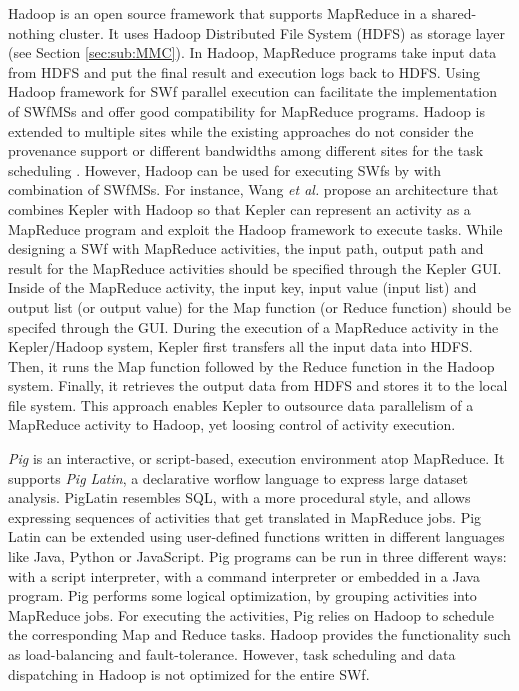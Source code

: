 Hadoop is an open source framework that supports MapReduce in a shared-nothing cluster.
It uses Hadoop Distributed File System (HDFS) as storage layer
(see Section \ref{sec:sub:MMC}). In Hadoop, MapReduce programs take
input data from HDFS and put the final result and execution logs back
to HDFS. Using Hadoop framework for SWf parallel execution can
facilitate the implementation of SWfMSs and offer good compatibility
for MapReduce programs.
Hadoop is extended to multiple sites while the existing approaches do not consider the provenance support or different bandwidths among different sites for the task scheduling \cite{Wang2013}. However, Hadoop can be used for executing SWfs by with combination of SWfMSs.
For instance, Wang \textit{et al.}
\cite{Wang2009} propose an architecture that combines
Kepler with Hadoop so that Kepler can represent an activity as a
MapReduce program and exploit the Hadoop framework to execute tasks. While
designing a SWf with MapReduce activities, the input
path, output path and result for the MapReduce activities should be
specified through the Kepler GUI. Inside of the MapReduce activity, the
input key, input value (input list) and output list (or output value) for the
Map function (or Reduce function) should be specifed through the
GUI. During the execution of a MapReduce activity in the Kepler/Hadoop
system,
Kepler first transfers all the input data into
HDFS. Then, it runs the Map function followed by the Reduce function in the
Hadoop system.
Finally, it retrieves the output
data from HDFS and stores it to the local file system.
This approach enables Kepler to
outsource data parallelism of a MapReduce activity to Hadoop, yet
loosing control of activity execution.


\textit{Pig} \cite{Olston2008} is 
an interactive, or script-based, execution environment atop MapReduce. 
It supports \textit{Pig Latin},  a declarative worflow language to
express large dataset analysis.
PigLatin resembles SQL, with a more procedural style, and allows
expressing sequences of activities that get translated in MapReduce jobs.
Pig Latin can be extended using user-defined functions
written in different languages like Java, Python or JavaScript.
Pig programs can be run in three different ways: with a script
interpreter, with a command interpreter or embedded in a Java program.
Pig performs some logical optimization, by grouping activities into
MapReduce jobs. For executing the activities, Pig
relies on Hadoop to schedule the corresponding Map and Reduce tasks.
Hadoop provides the functionality such as 
load-balancing and fault-tolerance. However, task scheduling and data dispatching in 
Hadoop is not optimized for the entire SWf. 


